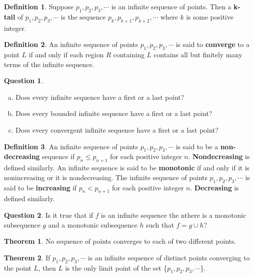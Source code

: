 \documentclass{article}
\theoremstyle{definition}
\newtheorem{definition}{Definition}
\newtheorem{question}{Question}
\newtheorem{theorem}{Theorem}
\theoremstyle{definition}
\theoremstyle{plain}
\begin{document}
\begin{definition}
  Suppose $p_1, p_2, p_3, \cdots$ is an infinite sequence of points. Then a
  \textbf{k-tail} of $p_1, p_2, p_3, \cdots$ is the sequence $p_k, p_{k+1},
  p_{k+2}, \cdots$ where $k$ is some positive integer.
\end{definition}

\begin{definition}
  An infinite sequence of points $p_1, p_2, p_3, \cdots$ is said to
  \textbf{converge} to a point $L$ if and only if each region $R$ containing
  $L$ contains all but finitely many terms of the infinite sequence.
\end{definition}

\begin{question}
  \begin{enumerate}[a.]
    \item Does every infinite sequence have a first or a last point?
    \item Does every bounded infinite sequence have a first or a last point?
    \item Does every convergent infinite sequence have a first or a last point?
  \end{enumerate}
\end{question}

\begin{definition}
  An infinite sequence of points $p_1, p_2, p_3, \cdots$ is said to be a
  \textbf{non-decreasing} sequence if $p_n \leq p_{n+1}$ for each positive
  integer $n$.  \textbf{Nondecreasing} is defined similarly.  An infinite
  sequence is said to be \textbf{monotonic} if and only if it is nonincreasing
  or it is nondecreasing.  The infinite sequence of points $p_1, p_2, p_3,
  \cdots$ is said to be \textbf{increasing} if $p_n < p_{n+1}$ for each
  positive integer $n$.  \textbf{Decreasing} is defined similarly.
\end{definition}

\begin{question}
  Is it true that if $f$ is an infinite sequence the nthere is a monotonic
  subsequence $g$ and a monotonic subsequence $h$ such that $f = g \cup h$?
\end{question}

\begin{theorem}
  No sequence of points converges to each of two different points.
\end{theorem}

\begin{theorem}
  If $p_1, p_2, p_3, \cdots$ is an infinite sequence of distinct points
  converging to the point $L$, then $L$ is the only limit point of the set
  \{$p_1, p_2, p_3, \cdots$\}.
\end{theorem}
\end{document}
